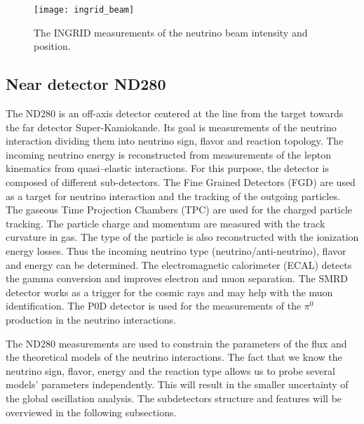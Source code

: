 \documentclass[../main.tex]{subfiles}
\begin{document}
\begin{figure}[!ht]
  \centering
  \texttt{[image: ingrid\_beam]}
  \caption{The INGRID measurements of the neutrino beam intensity and position.}
  \label{fig:t2k:ingrid_beam}
\end{figure}

\subsection{Near detector ND280}
\label{sec:T2K:nd280}
The ND280 is an off-axis detector centered at the line from the target towards the far detector Super-Kamiokande. Its goal is measurements of the neutrino interaction dividing them into neutrino sign, flavor and reaction topology. The incoming neutrino energy is reconstructed from measurements of the lepton kinematics from quasi--elastic interactions. For this purpose, the detector is composed of different sub-detectors. The Fine Grained Detectors (FGD) are used as a target for neutrino interaction and the tracking of the outgoing particles. The gaseous Time Projection Chambers (TPC) are used for the charged particle tracking. The particle charge and momentum are measured with the track curvature in gas. The type of the particle is also reconstructed with the ionization energy losses. Thus the incoming neutrino type (neutrino/anti-neutrino), flavor and energy can be determined. The electromagnetic calorimeter (ECAL) detects the gamma conversion and improves electron and muon separation. The SMRD detector works as a trigger for the cosmic rays and may help with the muon identification. The P0D detector is used for the measurements of the $\pi^0$ production in the neutrino interactions.

The ND280 measurements are used to constrain the parameters of the flux and the theoretical models of the neutrino interactions. The fact that we know the neutrino sign, flavor, energy and the reaction type allows us to probe several models' parameters independently. This will result in the smaller uncertainty of the global oscillation analysis. The subdetectors structure and features will be overviewed in the following subsections.
\end{document}
